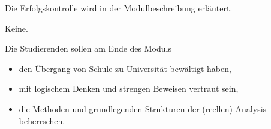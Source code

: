 \begin{course}

\setdoclanguagegerman
{}



\coursehead


\label{cour_6173.dp_997}


\begin{styleenv}
\begin{assessment}
Die Erfolgskontrolle wird in der Modulbeschreibung erläutert.


\end{assessment}

\begin{conditions}Keine.\end{conditions}


\end{styleenv}

\begin{learningoutcomes}
Die Studierenden sollen am Ende des Moduls

 \begin{itemize}\item den Übergang von Schule zu Universität bewältigt haben,  \item mit logischem Denken und strengen Beweisen vertraut sein,  \item die Methoden und grundlegenden Strukturen der (reellen) Analysis beherrschen.  \end{itemize}
\end{learningoutcomes}


\end{course}
